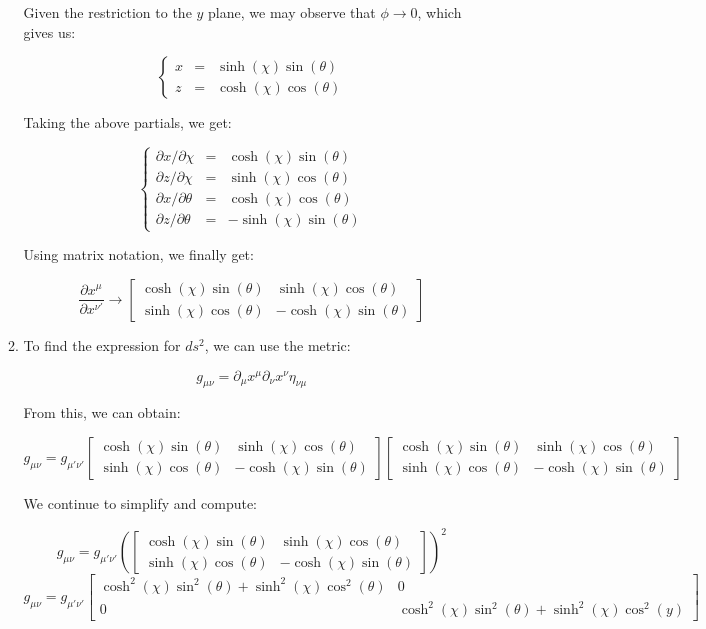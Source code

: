 \begin{enumerate}
\begin{enumerate}
        Given the restriction to the $y$ plane, we may observe that $\phi\to0$, which gives us:

        $$\left\{\begin{array}{lll} x&=& \sinh(\chi)\sin(\theta)\\z&= &\cosh(\chi)\cos(\theta)\end{array}$$

          Taking the above partials, we get:

        $$\left\{\begin{array}{lll} \partial x/\partial\chi &=& \cosh(\chi)\sin(\theta)\\\partial z/\partial \chi&= &\sinh(\chi)\cos(\theta)\\\partial x/\partial\theta &=& \cosh(\chi)\cos(\theta)\\\partial z/\partial \theta&= &-\sinh(\chi)\sin(\theta)\end{array}$$

          Using matrix notation, we finally get:

          $$\boxed{\frac{\partial x^{\mu}}{\partial x^{\nu'}}\to\left[ \begin{matrix} \cosh(\chi)\sin(\theta) & \sinh(\chi)\cos(\theta)\\ \sinh(\chi)\cos(\theta) & -\cosh(\chi)\sin(\theta) \end{matrix} \right]}$$

      \item

        To find the expression for $ds^2$, we can use the metric:

        $$g_{\mu\nu}=\partial_{\mu} x^{\mu}\partial_{\nu}x^{\nu}\eta_{\nu\mu}$$

        From this, we can obtain:

        $$g_{\mu\nu}=g_{\mu'\nu'}\left[ \begin{matrix} \cosh(\chi)\sin(\theta) & \sinh(\chi)\cos(\theta)\\ \sinh(\chi)\cos(\theta) & -\cosh(\chi)\sin(\theta) \end{matrix} \right]\left[ \begin{matrix} \cosh(\chi)\sin(\theta) & \sinh(\chi)\cos(\theta)\\ \sinh(\chi)\cos(\theta) & -\cosh(\chi)\sin(\theta) \end{matrix} \right]$$

        We continue to simplify and compute:

        $$g_{\mu\nu}=g_{\mu'\nu'}\left(\left[ \begin{matrix} \cosh(\chi)\sin(\theta) & \sinh(\chi)\cos(\theta)\\ \sinh(\chi)\cos(\theta) & -\cosh(\chi)\sin(\theta) \end{matrix} \right]\right)^2$$
        $$g_{\mu\nu}=g_{\mu'\nu'}\left[ \begin{matrix} \cosh^2(\chi)\sin^2(\theta)+\sinh^2(\chi)\cos^2(\theta) & 0\\ 0 & \cosh^2(\chi)\sin^2(\theta)+\sinh^2(\chi)\cos^2(y) \end{matrix} \right]$$


\end{enumerate}
\end{enumerate}
